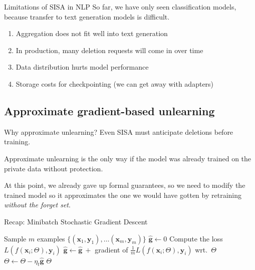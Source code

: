 \documentclass[12pt,aspectratio=169,handout]{beamer}
\begin{document}
\begin{frame}{Limitations of SISA in NLP}
So far, we have only seen classification models, because transfer to text generation models is difficult.

\begin{enumerate}
    \item Aggregation does not fit well into text generation
    \item In production, many deletion requests will come in over time
    \item Data distribution hurts model performance
    \item Storage costs for checkpointing (we can get away with adapters)
\end{enumerate}

\end{frame}

\subsection{Approximate gradient-based unlearning}

\begin{frame}{Why approximate unlearning?}
Even SISA must \alert{anticipate} deletions before training. 


Approximate unlearning is the only way if the model was already trained on the private data without protection.


At this point, we already gave up formal guarantees, so we need to modify the trained model so it \alert{approximates} the one we would have gotten by retraining \emph{without the forget set}.
    
\end{frame}



\begin{frame}{Recap: Minibatch Stochastic Gradient Descent}

\begin{algorithmic}[1]
		\State Sample $m$ examples $\{ (\bm{x}_1, \bm{y}_1), \ldots (\bm{x}_m, \bm{y}_m) \}$
		\State $\hat{\bm{g}} \gets 0$
			\State Compute the loss $L(f(\bm{x}_i; \Theta), \bm{y}_i)$
			\State $\hat{\bm{g}} \gets \hat{\bm{g}}\ + $ gradient of $\frac{1}{m} L(f(\bm{x}_i; \Theta), \bm{y}_i)$ wrt.\ $\Theta$
		\EndFor
		\State $\Theta \gets \Theta - \eta_t \hat{\bm{g}}$
		\EndWhile
		\State \Return $\Theta$
		\EndFunction
	\end{algorithmic}
	

\end{frame}
\end{document}
